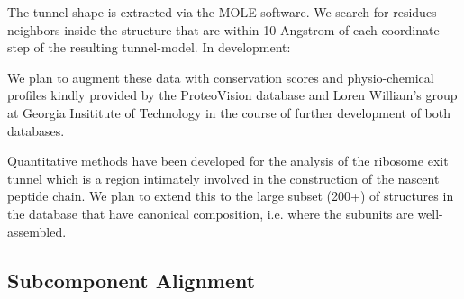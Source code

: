 \documentclass[11pt]{article}
\begin{document}
The tunnel shape is extracted via the MOLE software. We search for residues-neighbors inside the structure that are within 10 Angstrom of each coordinate-step of the resulting tunnel-model.
In development:

We plan to augment these data with conservation scores and physio-chemical profiles kindly provided by the ProteoVision database and Loren William's group at Georgia Insititute of Technology in the course of further development of both databases.

Quantitative methods have been developed for the analysis of the ribosome exit tunnel which is a region intimately involved in the construction of the nascent peptide chain. We plan to extend this to the large subset (200+) of structures in the database that have canonical composition, i.e. where the subunits are well-assembled.

\subsection{Subcomponent Alignment}
\end{document}
